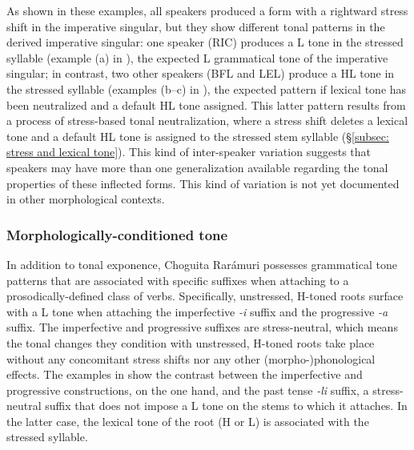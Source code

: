 \newpage
As shown in these examples, all speakers produced a form with a rightward stress shift in the imperative singular, but they show different tonal patterns in the derived imperative singular: one speaker (RIC) produces a L tone in the stressed syllable (example (a) in ), the expected L grammatical tone of the imperative singular; in contrast, two other speakers (BFL and LEL) produce a HL tone in the stressed syllable (examples (b--c) in ), the expected pattern if lexical tone has been neutralized and a default HL tone assigned. This latter pattern results from a process of stress-based tonal neutralization, where a stress shift deletes a lexical tone and a default HL tone is assigned to the stressed stem syllable (§\ref{subsec: stress and lexical tone}). This kind of inter-speaker variation suggests that speakers may have more than one generalization available regarding the tonal properties of these inflected forms. This kind of variation is not yet documented in other morphological contexts.

\subsubsection{Morphologically-conditioned tone}
\label{subsubsec: morphologically conditioned tone}

In addition to tonal exponence, Choguita Rarámuri possesses grammatical tone patterns that are associated with specific suffixes when attaching to a prosodically-defined class of verbs. Specifically, unstressed, H-toned roots surface with a L tone when attaching the imperfective \textit{-i} suffix and the progressive \textit{-a} suffix. The imperfective and progressive suffixes are stress-neutral, which means the tonal changes they condition with unstressed, H-toned roots take place without any concomitant stress shifts nor any other (morpho-)phonological effects. The examples in  show the contrast between the imperfective and progressive constructions, on the one hand, and the past tense \textit{-li} suffix, a stress-neutral suffix that does not impose a L tone on the stems to which it attaches. In the latter case, the lexical tone of the root (H or L) is associated with the stressed syllable.

